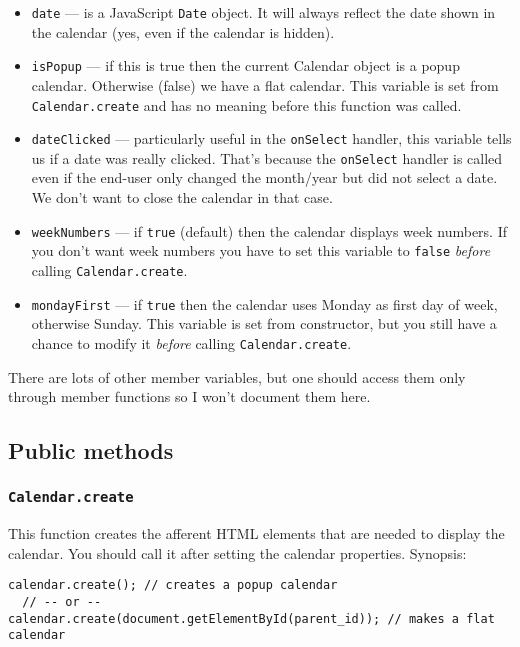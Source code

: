 \documentclass[a4paper,10pt]{article}
\begin{document}
\begin{itemize}

\item \texttt{date} --- is a JavaScript \texttt{Date} object.  It will always
reflect the date shown in the calendar (yes, even if the calendar is hidden).

\item \texttt{isPopup} --- if this is true then the current Calendar object is
a popup calendar.  Otherwise (false) we have a flat calendar.  This variable is
set from \texttt{Calendar.create} and has no meaning before this function was
called.

\item \texttt{dateClicked} --- particularly useful in the \texttt{onSelect}
handler, this variable tells us if a date was really clicked.  That's because
the \texttt{onSelect} handler is called even if the end-user only changed the
month/year but did not select a date.  We don't want to close the calendar in
that case.

\item \texttt{weekNumbers} --- if \texttt{true} (default) then the calendar
displays week numbers.  If you don't want week numbers you have to set this
variable to \texttt{false} \emph{before} calling \texttt{Calendar.create}.

\item \texttt{mondayFirst} --- if \texttt{true} then the calendar uses Monday
as first day of week, otherwise Sunday.  This variable is set from constructor,
but you still have a chance to modify it \emph{before} calling
\texttt{Calendar.create}.

\end{itemize}

There are lots of other member variables, but one should access them only
through member functions so I won't document them here.

\subsection{Public methods}

\subsubsection{\texttt{Calendar.create}}\label{sec:Calendar.create}

This function creates the afferent HTML elements that are needed to display the
calendar.  You should call it after setting the calendar properties.  Synopsis:
\begin{verbatim}
calendar.create(); // creates a popup calendar
  // -- or --
calendar.create(document.getElementById(parent_id)); // makes a flat calendar
\end{verbatim}
\end{document}
